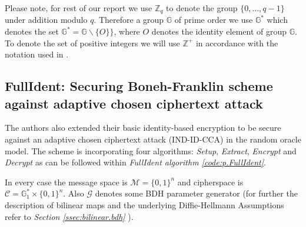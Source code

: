 Please note, for rest of our report we use $\mathbb{Z}_q$ to denote the group $\{ 0, \ldots , q-1\}$ under addition modulo $q$. Therefore a group $\mathbb{G}$ of prime order we use $\mathbb{G}^*$ which denotes the set $\mathbb{G}^* = \mathbb{G}\backslash\{O\} \}$, where $O$ denotes the identity element of group $\mathbb{G}$. To denote the set of positive integers we will use $\mathbb{Z}^{+}$ in accordance with the notation used in \cite{BF01}.

\subsection{FullIdent: Securing Boneh-Franklin scheme against adaptive chosen ciphertext attack}
\label{ssec:fullident}


The authors also extended their basic identity-based encryption to be secure against an adaptive chosen ciphertext attack (IND-ID-CCA) in the random oracle model. \cite{BF01} The scheme is incorporating four algorithms: \textit{Setup}, \textit{Extract}, \textit{Encrypt} and \textit{Decrypt} as can be followed within \textit{FullIdent algorithm \ref{code:p.FullIdent}}. 

In every case the message space is $\mathcal{M}=\{0,1\}^n$ and cipherspace is $\mathcal{C}= \mathbb{G}^*_1 \times \{0,1\}^n$. Also $\mathcal{G}$ denotes some BDH parameter generator (for further the description of bilinear maps and the underlying  Diffie-Hellmann Assumptions refer to \textit{Section \ref{ssec:bilinear.bdh}}
).\cite{BF01}

